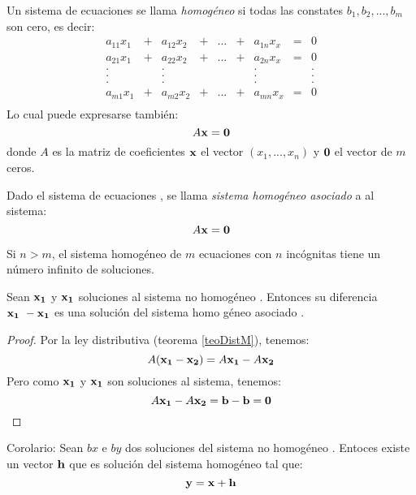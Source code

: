 \documentclass[alge.tex]{subfiles}
\begin{document}
\begin{mydef}
  Un sistema de ecuaciones se llama \emph{homog\'eneo} si todas las
  constates \(b_1, b_2, ..., b_m\) son cero, es decir:
  \[
  \begin{matrix}
    a_{11}x_1 & + & a_{12}x_2 & + & ... & + & a_{1n}x_x & = & 0\\
    a_{21}x_1 & + & a_{22}x_2 & + & ... & + & a_{2n}x_x & = & 0\\
    . &  & . & & & & . & & .\\
    . &  & . & & & & . & & .\\
    . &  & . & & & & . & & .\\
    a_{m1}x_1 & + & a_{m2}x_2 & + & ... & + & a_{mn}x_x & = & 0\\
  \end{matrix}  
  \]
  Lo cual puede expresarse tambi\'en:
  \[A\mathbf{x}=\mathbf{0}\]
  donde \(A\) es la matriz de coeficientes \(\mathbf{x}\) el vector
  \((x_1, ..., x_n)\) y \(\mathbf{0}\) el vector de \(m\) ceros.
\end{mydef}

\begin{mydef}
  Dado el sistema de ecuaciones , se llama
  \emph{sistema homog\'eneo asociado} a  al sistema:
  \[A\mathbf{x}=\mathbf{0}\]
\end{mydef}

\begin{teo}
  Si \(n > m\), el sistema homog\'eneo de \(m\) ecuaciones con \(n\)
  inc\'ognitas tiene un n\'umero infinito de soluciones.
\end{teo}

\begin{teo}
  Sean \(\mathbf{x_1}\) y \(\mathbf{x_1}\) soluciones al sistema no
  homog\'eneo . Entonces su diferencia
  \(\b{x_1}\ -\b{x_1}\) es una soluci\'on del sistema homo
  g\'eneo asociado .
\end{teo}
\begin{proof}
  Por la ley distributiva (teorema \ref{teoDistM}), tenemos: 
  \[A(\mathbf{x_1} - \mathbf{x_2}) = A\mathbf{x_1} - A\mathbf{x_2}\]
  Pero como \(\mathbf{x_1}\) y \(\mathbf{x_1}\) son soluciones al
  sistema, tenemos:
  \[ A\mathbf{x_1} - A\mathbf{x_2} = \mathbf{b} - \mathbf{b} = \mathbf{0}\]
\end{proof}

Corolario: Sean \(b{x}\) e \(b{y}\) dos soluciones del sistema no
homog\'eneo . Entoces existe un vector \(\mathbf{h}\) que es
soluci\'on del sistema homog\'eneo tal que:
\[ \mathbf{y} = \mathbf{x} + \mathbf{h}\]
\end{document}
